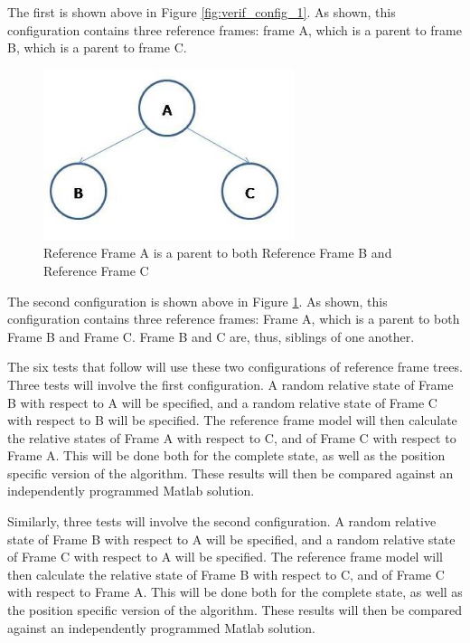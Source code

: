 The first is shown above in Figure \ref{fig:verif_config_1}. As shown, this
configuration contains three reference frames: frame A, which is a parent to
frame B, which is a parent to frame C.

\begin{figure}[H]
\begin{center}
\includegraphics[height=50mm]{figs/verif_case_2.jpg}
\caption{Reference Frame A is a parent to both Reference Frame B and
Reference Frame C}
\label{fig:verif_config_2}
\end{center}
\end{figure}

The second configuration is shown above in Figure \ref{fig:verif_config_2}.
As shown, this configuration contains three reference frames: Frame A, which
is a parent to both Frame B and Frame C. Frame B and C are, thus, siblings
of one another.

The six tests that follow will use these two configurations of reference
frame trees. Three tests will involve the first configuration. A random relative
state of Frame B with respect to A will be specified, and a random relative state
of Frame C with respect to B will be specified. The reference frame model will
then calculate the relative states of Frame A with respect to C, and of Frame
C with respect to Frame A. This will be done both for the complete state, as well
as the position specific version of the algorithm. These results will then
be compared against an independently programmed Matlab solution.

Similarly, three tests will involve the second configuration. A random relative
state of Frame B with respect to A will be specified, and a random relative state
of Frame C with respect to A will be specified. The reference frame model
will then calculate the relative state of Frame B with respect to C, and
of Frame C with respect to Frame A. This will be done both for the complete state,
as well as the position specific version of the algorithm. These results
will then be compared against an independently programmed Matlab solution.

